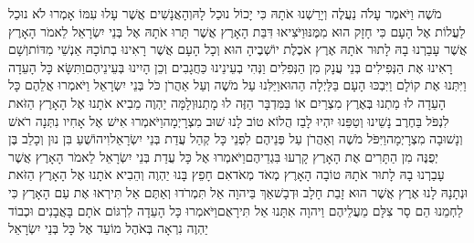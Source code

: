 \documentclass[../main/main.tex]{subfiles}
\begin{document}
\begin{multicols}{\ncols}
מֹשֶׁה וַיֹּאמֶר עָלֹה נַעֲלֶה וְיָרַשְׁנוּ אֹתָהּ כִּי יָכוֹל נוּכַל לָהּ\PreVerseSpace{}וְהָאֲנָשִׁים אֲשֶׁר עָלוּ עִמּוֹ אָמְרוּ לֹא נוּכַל לַעֲלוֹת אֶל הָעָם כִּי חָזָק הוּא מִמֶּנּוּ\PreVerseSpace{}וַיֹּצִיאוּ דִּבַּת הָאָרֶץ אֲשֶׁר תָּרוּ אֹתָהּ אֶל בְּנֵי יִשְׂרָאֵל לֵאמֹר הָאָרֶץ אֲשֶׁר עָבַרְנוּ בָהּ לָתוּר אֹתָהּ אֶרֶץ אֹכֶלֶת יוֹשְׁבֶיהָ הוּא וְכָל הָעָם אֲשֶׁר רָאִינוּ בְתוֹכָהּ אַנְשֵׁי מִדּוֹת\PreVerseSpace{}וְשָׁם רָאִינוּ אֶת הַנְּפִילִים בְּנֵי עֲנָק מִן הַנְּפִלִים וַנְּהִי בְעֵינֵינוּ כַּחֲגָבִים וְכֵן הָיִינוּ בְּעֵינֵיהֶם\PreChapterSpace{}וַתִּשָּׂא כָּל הָעֵדָה וַיִּתְּנוּ אֶת קוֹלָם וַיִּבְכּוּ הָעָם בַּלַּיְלָה הַהוּא\PreVerseSpace{}וַיַּלִּנוּ\SubEnd{} עַל מֹשֶׁה וְעַל אַהֲרֹן כֹּל בְּנֵי יִשְׂרָאֵל וַיֹּאמְרוּ אֲלֵהֶם כָּל הָעֵדָה לוּ מַתְנוּ בְּאֶרֶץ מִצְרַיִם אוֹ בַּמִּדְבָּר הַזֶּה לוּ מָתְנוּ\PreVerseSpace{}וְלָמָּה יַהְוֶה מֵבִיא אֹתָנוּ אֶל הָאָרֶץ הַזֹּאת לִנְפֹּל בַּחֶרֶב נָשֵׁינוּ וְטַפֵּנוּ יִהְיוּ לָבַז הֲלוֹא טוֹב לָנוּ שׁוּב מִצְרָיְמָה\PreVerseSpace{}וַיֹּאמְרוּ אִישׁ אֶל אָחִיו נִתְּנָה רֹאשׁ וְנָשׁוּבָה מִצְרָיְמָה\PreVerseSpace{}וַיִּפֹּל מֹשֶׁה וְאַהֲרֹן עַל פְּנֵיהֶם לִפְנֵי כָּל קְהַל עֲדַת בְּנֵי יִשְׂרָאֵל\PreVerseSpace{}וִיהוֹשֻׁעַ בִּן נוּן וְכָלֵב בֶּן יְפֻנֶּה מִן הַתָּרִים אֶת הָאָרֶץ קָרְעוּ בִּגְדֵיהֶם\PreVerseSpace{}וַיֹּאמְרוּ אֶל כָּל עֲדַת בְּנֵי יִשְׂרָאֵל לֵאמֹר הָאָרֶץ אֲשֶׁר עָבַרְנוּ בָהּ לָתוּר אֹתָהּ טוֹבָה הָאָרֶץ מְאֹד מְאֹד\PreVerseSpace{}אִם חָפֵץ בָּנוּ יַהְוֶה וְהֵבִיא אֹתָנוּ אֶל הָאָרֶץ הַזֹּאת וּנְתָנָהּ לָנוּ אֶרֶץ אֲשֶׁר הוּא זָבַת חָלָב וּדְבָשׁ\PreVerseSpace{}אַךְ בַּיהוָה אַל תִּמְרֹדוּ וְאַתֶּם אַל תִּירְאוּ אֶת עַם הָאָרֶץ כִּי לַחְמֵנוּ הֵם סָר צִלָּם מֵעֲלֵיהֶם וַיהוָה אִתָּנוּ אַל תִּירָאֻם\PreVerseSpace{}וַיֹּאמְרוּ כָּל הָעֵדָה לִרְגּוֹם אֹתָם בָּאֲבָנִים וּכְבוֹד יַהְוֶה נִרְאָה בְּאֹהֶל מוֹעֵד אֶל כָּל בְּנֵי יִשְׂרָאֵל\OpenSection{}\par

\end{multicols}
\end{document}

